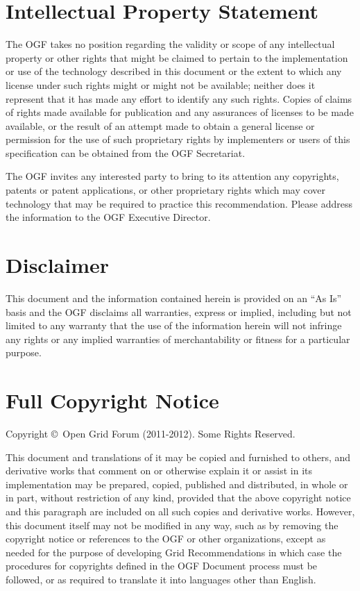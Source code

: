 \documentclass[12pt]{article}  %
\newcommand{\copyrightyears}{2011-2012}  %
\begin{document}
\section*{Intellectual Property Statement}

The OGF takes no position regarding the validity or scope of any intellectual
property or other rights that might be claimed to pertain to the
implementation or use of the technology described in this document or the
extent to which any license under such rights might or might not be
available; neither does it represent that it has made any effort to identify
any such rights. Copies of claims of rights made available for publication
and any assurances of licenses to be made available, or the result of an
attempt made to obtain a general license or permission for the use of such
proprietary rights by implementers or users of this specification can be
obtained from the OGF Secretariat.

The OGF invites any interested party to bring to its attention any
copyrights, patents or patent applications, or other proprietary rights which
may cover technology that may be required to practice this recommendation.
Please address the information to the OGF Executive Director.

\section*{Disclaimer}

This document and the information contained herein is provided on an ``As
Is'' basis and the OGF disclaims all warranties, express or implied,
including but not limited to any warranty that the use of the information
herein will not infringe any rights or any implied warranties of
merchantability or fitness for a particular purpose.

\section*{Full Copyright Notice}

Copyright \copyright \ Open Grid Forum (\copyrightyears). Some Rights Reserved.

This document and translations of it may be copied and furnished to others,
and derivative works that comment on or otherwise explain it or assist in its
implementation may be prepared, copied, published and distributed, in whole
or in part, without restriction of any kind, provided that the above
copyright notice and this paragraph are included on all such copies and
derivative works. However, this document itself may not be modified in any
way, such as by removing the copyright notice or references to the OGF or
other organizations, except as needed for the purpose of developing Grid
Recommendations in which case the procedures for copyrights defined in the
OGF Document process must be followed, or as required to translate it into
languages other than English.
\end{document}
